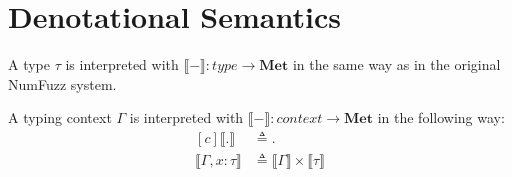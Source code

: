 \section{Denotational Semantics}
\begin{definition}
  A type $\tau$ is interpreted with $\llbracket - \rrbracket : \textit{type} \to
  \textbf{Met}$ in the same way as in the original NumFuzz system.
\end{definition}

\begin{definition}
  A typing context $\Gamma$ is interpreted with $\llbracket - \rrbracket :
  \textit{context} \to \textbf{Met}$ in the following way:
  \begin{equation}
  \begin{aligned}[c]
    \llbracket . \rrbracket &\triangleq . \\
    \llbracket \Gamma, x : \tau \rrbracket &\triangleq \llbracket \Gamma \rrbracket
      \times \llbracket \tau \rrbracket
  \end{aligned}
  \end{equation}
\end{definition}

